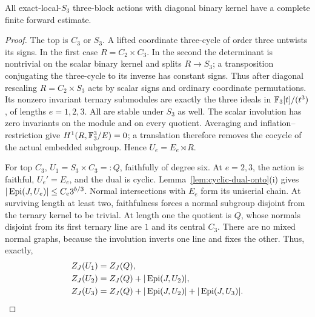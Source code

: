 \begin{proposition}\label{prop:three-s3-one-sign}
All exact-local-$S_3$ three-block actions with diagonal binary kernel
have a complete finite forward estimate.
\end{proposition}
\begin{proof}
The top is $C_3$ or $S_3$. A lifted coordinate three-cycle of order
three untwists its signs. In the first case $R=C_2\times C_3$.
In the second the determinant is nontrivial on the scalar binary
kernel and splits $R\to S_3$; a transposition conjugating the
three-cycle to its inverse has constant signs. Thus after diagonal
rescaling $R=C_2\times S_3$ acts by scalar signs and ordinary
coordinate permutations. Its nonzero invariant ternary submodules
are exactly the three ideals in $\mathbb F_3[t]/(t^3)$, of lengths
$e=1,2,3$. All are stable under $S_3$ as well.
The scalar involution has zero invariants on the module and on
every quotient. Averaging and inflation--restriction give
$H^1(R,\mathbb F_3^3/E)=0$; a translation therefore removes the cocycle
of the actual embedded subgroup. Hence $U_e=E_e\rtimes R$.

For top $C_3$, $U_1=S_3\times C_3=:Q$, faithfully of degree six.
At $e=2,3$, the action is faithful, $U_e'=E_e$, and the dual is
cyclic. Lemma~\ref{lem:cyclic-dual-onto}(i) gives
$|\operatorname{Epi}(J,U_e)|\leq C_e3^{b/3}$.
Normal intersections with $E_e$ form its uniserial chain. At
surviving length at least two, faithfulness forces a normal subgroup
disjoint from the ternary kernel to be trivial. At length one the
quotient is $Q$, whose normals disjoint from its first ternary line
are $1$ and its central $C_3$. There are no mixed normal graphs,
because the involution inverts one line and fixes the other.
Thus, exactly,
\begin{align*}
 Z_J(U_1)&=Z_J(Q),\\
 Z_J(U_2)&=Z_J(Q)+|\operatorname{Epi}(J,U_2)|,\\
 Z_J(U_3)&=Z_J(Q)+|\operatorname{Epi}(J,U_2)|+|\operatorname{Epi}(J,U_3)|.
\end{align*}


\end{proof}
